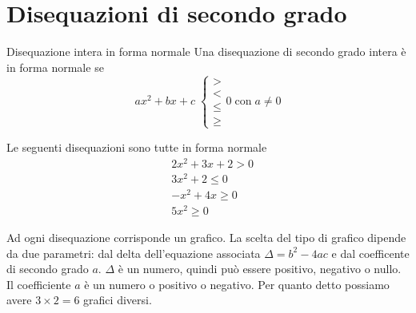\section{Disequazioni di secondo grado}
\begin{definizionet}{Disequazione intera in forma normale}{}
	Una disequazione di secondo grado intera è in forma normale se \[ax^2+bx+c\;\begin{cases}
	>\\
	<\\
	\leq\\
	\geq
	\end{cases} 0\; \text{con}\; a\neq 0\]
\end{definizionet}
\begin{osservazionet}{}{}
	Le seguenti disequazioni sono tutte in forma normale
	\begin{align*}
	&2x^2+3x+2>0\\
	&3x^2+2\leq0\\
	&-x^2+4x\geq0\\
	&5x^2\geq0
	\end{align*}
\end{osservazionet} 
Ad ogni disequazione corrisponde un grafico. La scelta del tipo di grafico dipende da due parametri: dal delta dell'equazione associata $\Delta=b^2-4ac$ e dal coefficente di secondo grado $a$. $\Delta$  è un numero, quindi può essere positivo, negativo o nullo. Il coefficiente $a$ è un numero o positivo o negativo. Per quanto detto possiamo avere $3\times 2=6$ grafici diversi.
